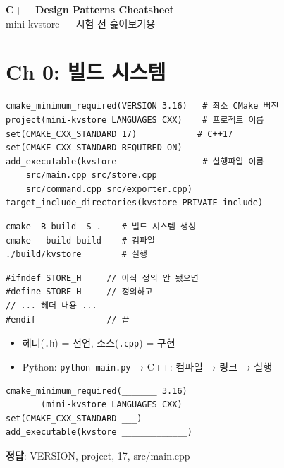 \documentclass[11pt,a4paper]{article}
\newcommand{\code}[1]{\texttt{#1}}
\begin{document}
\begin{center}
{\Huge\bfseries C++ Design Patterns Cheatsheet}\\[6pt]
{\large mini-kvstore --- 시험 전 훑어보기용}
\end{center}
\vspace{6pt}

\tableofcontents
\newpage

\section{Ch 0: 빌드 시스템}

\begin{lstlisting}[style=cmake,title={CMakeLists.txt}]
cmake_minimum_required(VERSION 3.16)   # 최소 CMake 버전
project(mini-kvstore LANGUAGES CXX)    # 프로젝트 이름
set(CMAKE_CXX_STANDARD 17)            # C++17
set(CMAKE_CXX_STANDARD_REQUIRED ON)
add_executable(kvstore                 # 실행파일 이름
    src/main.cpp src/store.cpp
    src/command.cpp src/exporter.cpp)
target_include_directories(kvstore PRIVATE include)
\end{lstlisting}

\begin{lstlisting}[style=shell,title={빌드 \& 실행},numbers=none]
cmake -B build -S .    # 빌드 시스템 생성
cmake --build build    # 컴파일
./build/kvstore        # 실행
\end{lstlisting}

\begin{lstlisting}[style=cpp,title={Include Guard --- 헤더 중복 포함 방지}]
#ifndef STORE_H     // 아직 정의 안 됐으면
#define STORE_H     // 정의하고
// ... 헤더 내용 ...
#endif              // 끝
\end{lstlisting}

\begin{itemize}[nosep]
\item 헤더(\code{.h}) = 선언, 소스(\code{.cpp}) = 구현
\item Python: \code{python main.py} → C++: 컴파일 → 링크 → 실행
\end{itemize}

\begin{quizbox}[title={Q0-1}]
\begin{lstlisting}[style=cmake,numbers=none]
cmake_minimum_required(_______ 3.16)
_______(mini-kvstore LANGUAGES CXX)
set(CMAKE_CXX_STANDARD ___)
add_executable(kvstore _____________)
\end{lstlisting}
\textbf{정답}: VERSION, project, 17, src/main.cpp
\end{quizbox}
\end{document}
